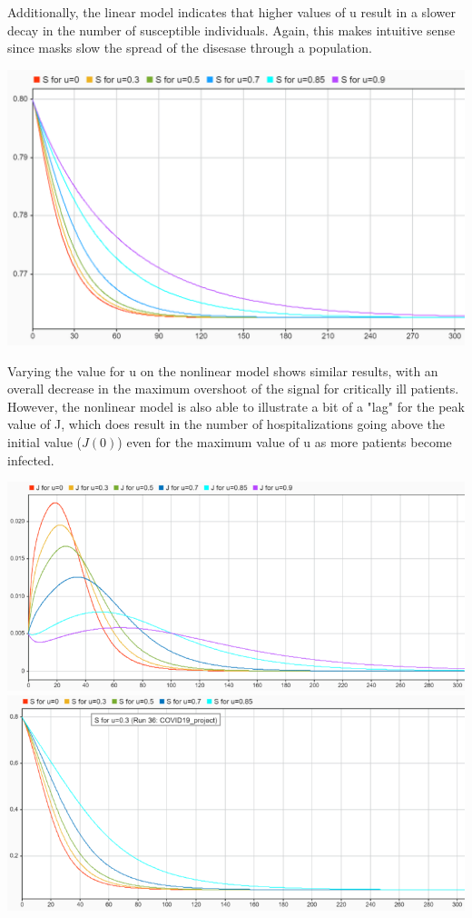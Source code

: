 \documentclass[fleqn]{article}
\begin{document}
Additionally, the linear model indicates that higher values of u result in a slower decay in the number of susceptible individuals. Again, this makes intuitive sense since masks slow the spread of the disesase through a population.
\begin{center}
    \includegraphics[width=\linewidth]{S_simulink_u_values}
\end{center}

\newpage

Varying the value for u on the nonlinear model shows similar results, with an overall decrease in the maximum overshoot of the signal for critically ill patients. However, the nonlinear model is also able to illustrate a bit of a "lag" for the peak value of J, which does result in the number of hospitalizations going above the initial value ($J(0)$) even for the maximum value of u as more patients become infected.

\begin{center}
    \includegraphics[width=\linewidth]{nonlinear_J_simulink_u_values}
    \includegraphics[width=\linewidth]{nonlinear_S_simulink_u_values}
\end{center}
\end{document}
